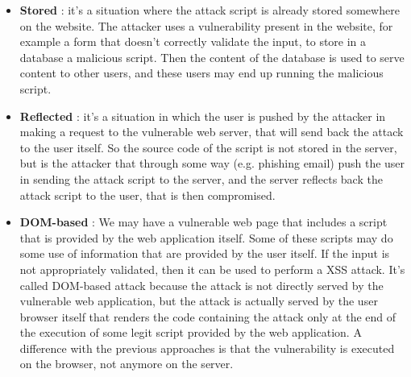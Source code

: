\begin{itemize}
\item \textbf{Stored} : it's a situation where the attack script is already stored somewhere on the website. The attacker uses a vulnerability present in the website, for example a form that doesn't correctly validate the input, to store in a database a malicious script. Then the content of the database is used to serve content to other users, and these users may end up running the malicious script.
\item \textbf{Reflected} : it's a situation in which the user is pushed by the attacker in making a request to the vulnerable web server, that will send back the attack to the user itself. So the source code of the script is not stored in the server, but is the attacker that through some way (e.g. phishing email) push the user in sending the attack script to the server, and the server reflects back the attack script to the user, that is then compromised.
\item \textbf{DOM-based} : We may have a vulnerable web page that includes a script that is provided by the web application itself. Some of these scripts may do some use of information that are provided by the user itself. If the input is not appropriately validated, then it can be used to perform a XSS attack. It's called DOM-based attack because the attack is not directly served by the vulnerable web application, but the attack is actually served by the user browser itself that renders the code containing the attack only at the end of the execution of some legit script provided by the web application. A difference with the previous approaches is that the vulnerability is executed on the browser, not anymore on the server.
\end{itemize}

